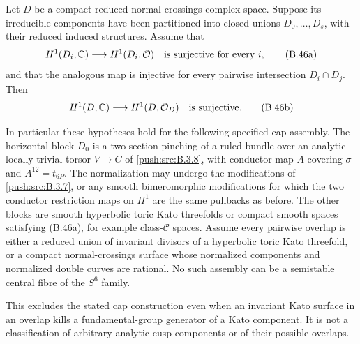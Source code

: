 \begin{proposition}\label{push:src:B.4.6}\label{push:B46}
Let $D$ be a compact reduced normal-crossings complex
space. Suppose its irreducible components have been
partitioned into closed unions $D_0,\ldots,D_s$, with
their reduced induced structures. Assume that
\[
 H^1(D_i,\mathbb C)\longrightarrow H^1(D_i,\mathcal O)
 \quad\hbox{is surjective for every }i,
 \tag{B.46a}
\]
and that the analogous map is injective for every
pairwise intersection $D_i\cap D_j$. Then
\[
 H^1(D,\mathbb C)\longrightarrow H^1(D,\mathcal O_D)
 \quad\hbox{is surjective}.
 \tag{B.46b}
\]

In particular these hypotheses hold for the following
specified cap assembly. The horizontal block $D_0$ is
a two-section pinching of a ruled bundle over an
analytic locally trivial torsor $V\to C$ of \ref{push:src:B.3.8},
with conductor map $A$ covering $\sigma$ and
$A^{12}=t_{6P}$. The normalization may undergo the
modifications of \ref{push:src:B.3.7}, or any smooth bimeromorphic
modifications for which the two conductor restriction
maps on $H^1$ are the same pullbacks as before.
The other blocks are smooth hyperbolic toric Kato
threefolds or compact smooth spaces satisfying
(B.46a), for example class-$\mathcal C$ spaces.
Assume every pairwise overlap is either a reduced
union of invariant divisors of a hyperbolic toric
Kato threefold, or a compact normal-crossings surface
whose normalized components and normalized double
curves are rational. No such assembly can be a
semistable central fibre of the $S^6$ family.

This excludes the stated cap construction even when
an invariant Kato surface in an overlap kills a
fundamental-group generator of a Kato component.
It is not a classification of arbitrary analytic
cusp components or of their possible overlaps.
\end{proposition}

